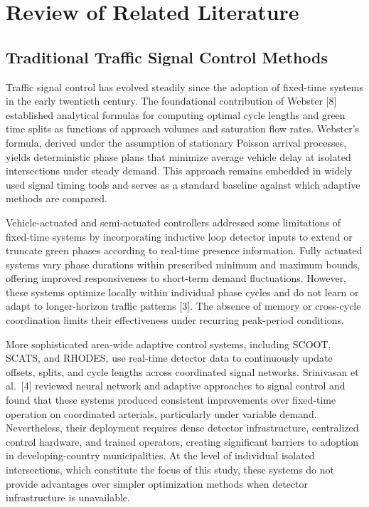 \documentclass[a4paper,10pt]{article}
\begin{document}
	\section{Review of Related Literature}
	
	\subsection{Traditional Traffic Signal Control Methods}
	
	Traffic signal control has evolved steadily since the adoption of fixed-time systems in the early twentieth century. The foundational contribution of Webster [8] established analytical formulas for computing optimal cycle lengths and green time splits as functions of approach volumes and saturation flow rates. Webster's formula, derived under the assumption of stationary Poisson arrival processes, yields deterministic phase plans that minimize average vehicle delay at isolated intersections under steady demand. This approach remains embedded in widely used signal timing tools and serves as a standard baseline against which adaptive methods are compared.
	
	Vehicle-actuated and semi-actuated controllers addressed some limitations of fixed-time systems by incorporating inductive loop detector inputs to extend or truncate green phases according to real-time presence information. Fully actuated systems vary phase durations within prescribed minimum and maximum bounds, offering improved responsiveness to short-term demand fluctuations. However, these systems optimize locally within individual phase cycles and do not learn or adapt to longer-horizon traffic patterns [3]. The absence of memory or cross-cycle coordination limits their effectiveness under recurring peak-period conditions.
	
	More sophisticated area-wide adaptive control systems, including SCOOT, SCATS, and RHODES, use real-time detector data to continuously update offsets, splits, and cycle lengths across coordinated signal networks. Srinivasan et al.~[4] reviewed neural network and adaptive approaches to signal control and found that these systems produced consistent improvements over fixed-time operation on coordinated arterials, particularly under variable demand. Nevertheless, their deployment requires dense detector infrastructure, centralized control hardware, and trained operators, creating significant barriers to adoption in developing-country municipalities. At the level of individual isolated intersections, which constitute the focus of this study, these systems do not provide advantages over simpler optimization methods when detector infrastructure is unavailable.
\end{document}
